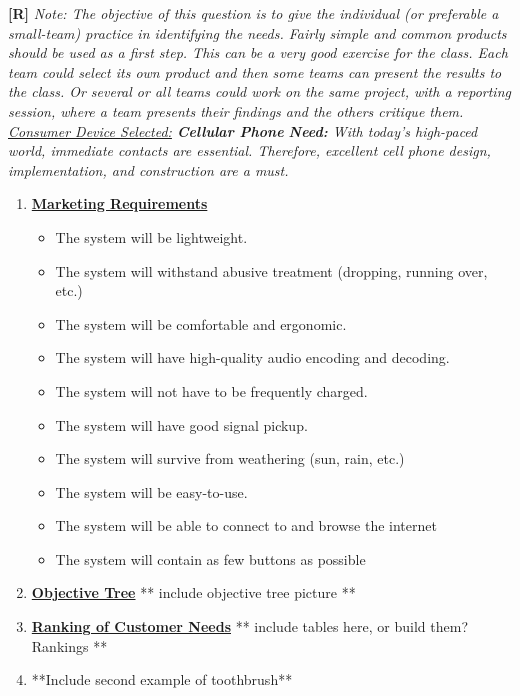 \begin{enumerate}
  \begin{onlysolution}
  \textbf{[R]}
  \itshape
  \emph{Note:} The objective of this question is to give the individual 
  (or preferable a small-team) practice in identifying the needs. Fairly 
  simple and common products should be used as a first step. This can be 
  a very good exercise for the class. Each team could select its own product 
  and then some teams can present the results to the class. Or several or 
  all teams could work on the same project, with a reporting session, where 
  a team presents their findings and the others critique them.
  \underline{Consumer Device Selected:} \textbf{Cellular Phone}
  \textbf{Need:} With today’s high-paced world, immediate contacts are essential. Therefore,
  excellent cell phone design, implementation, and construction are a must.
  \begin{enumerate}
    \item \underline{\textbf{Marketing Requirements}}
    \begin{itemize}
      \item The system will be lightweight.
      \item The system will withstand abusive treatment (dropping, running over, etc.)
      \item The system will be comfortable and ergonomic.
      \item The system will have high-quality audio encoding and decoding.
      \item The system will not have to be frequently charged.
      \item The system will have good signal pickup.
      \item The system will survive from weathering (sun, rain, etc.)
      \item The system will be easy-to-use.
      \item The system will be able to connect to and browse the internet
      \item The system will contain as few buttons as possible
    \end{itemize}
    \item \underline{\textbf{Objective Tree}}
    ** include objective tree picture **
    \item \underline{\textbf{Ranking of Customer Needs}}
    ** include tables here, or build them? Rankings **
    \item **Include second example of toothbrush**
  \end{enumerate}
  \end{onlysolution}


\end{enumerate}
